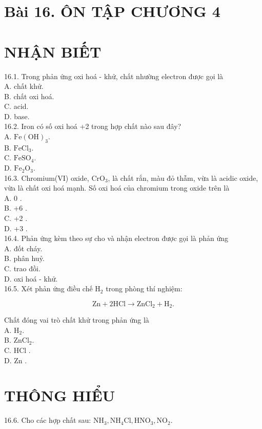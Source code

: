 \documentclass[10pt]{article}
\begin{document}
\section*{Bài 16. ÔN TẬP CHƯƠNG 4}
\section*{NHẬN BIẾT}
16.1. Trong phản ứng oxi hoá - khử, chất nhường electron được gọi là\\
A. chất khử.\\
B. chất oxi hoá.\\
C. acid.\\
D. base.\\
16.2. Iron có số oxi hoá +2 trong hợp chất nào sau đây?\\
A. $\mathrm{Fe}(\mathrm{OH})_{3}$.\\
B. $\mathrm{FeCl}_{3}$.\\
C. $\mathrm{FeSO}_{4}$.\\
D. $\mathrm{Fe}_{2} \mathrm{O}_{3}$.\\
16.3. Chromium(VI) oxide, $\mathrm{CrO}_{3}$, là chất rắn, màu đỏ thẫm, vừa là acidic oxide, vừa là chất oxi hoá mạnh. Số oxi hoá của chromium trong oxide trên là\\
A. 0 .\\
B. +6 .\\
C. +2 .\\
D. +3 .\\
16.4. Phản ứng kèm theo sự cho và nhận electron được gọi là phản ứng\\
A. đốt cháy.\\
B. phân huỷ.\\
C. trao đồi.\\
D. oxi hoá - khử.\\
16.5. Xét phản ứng điều chế $\mathrm{H}_{2}$ trong phòng thí nghiệm:

$$
\mathrm{Zn}+2 \mathrm{HCl} \longrightarrow \mathrm{ZnCl}_{2}+\mathrm{H}_{2} .
$$

Chất đóng vai trò chất khử trong phản ứng là\\
A. $\mathrm{H}_{2}$.\\
B. $\mathrm{ZnCl}_{2}$.\\
C. HCl .\\
D. Zn .

\section*{THÔNG HIỂU}
16.6. Cho các hợp chất sau: $\mathrm{NH}_{3}, \mathrm{NH}_{4} \mathrm{Cl}, \mathrm{HNO}_{3}, \mathrm{NO}_{2}$.
\end{document}
